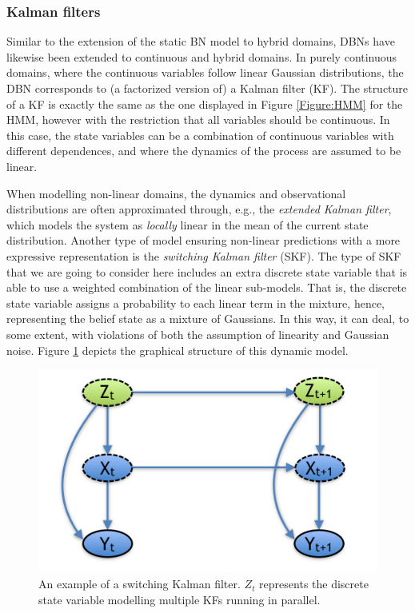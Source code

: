 \subsubsection{Kalman filters}\label{SubSubSection:KFs}

Similar to the extension of the static BN model to hybrid domains, DBNs have likewise been extended to continuous and hybrid domains. In purely continuous domains, where the continuous variables follow linear Gaussian distributions, the DBN corresponds to (a factorized version of) a Kalman filter (KF). The structure of a KF is exactly the same as the one displayed in Figure \ref{Figure:HMM} for the HMM, however with the restriction that all variables should be continuous. In this case, the state variables can be a combination of continuous variables with different dependences, and where the dynamics of the process are assumed to be linear. 

When modelling non-linear domains, the dynamics and observational distributions are often approximated through, e.g., the \textit{extended Kalman filter}, which models the system as \textit{locally} linear in the mean of the current state distribution. Another type of model ensuring non-linear predictions with a more expressive representation is the \textit{switching Kalman filter} (SKF). The type of SKF that we are going to consider here includes an extra discrete state variable that is able to use a weighted combination of the linear sub-models. That is, the discrete state variable assigns a probability to each linear term in the mixture, hence, representing the belief state as a mixture of Gaussians. In this way, it can deal, to some extent, with violations of both the assumption of linearity and Gaussian noise. Figure \ref{Figure:SKF} depicts the graphical structure of this dynamic model.

\begin{figure}[ht!]
\begin{center}
\includegraphics[scale=0.4]{./figures/PreliminariesSKF}
\caption{\label{Figure:SKF} An example of a switching Kalman filter. $Z_t$ represents the discrete state variable modelling multiple KFs running in parallel.}
\end{center}
\end{figure}

